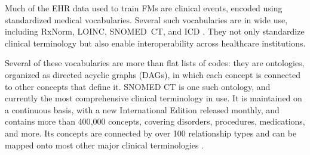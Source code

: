 Much of the EHR data used to train FMs are clinical events, encoded using standardized medical vocabularies. Several such vocabularies are in wide use, including RxNorm, LOINC, SNOMED~CT, and ICD . They not only standardize clinical terminology but also enable interoperability across healthcare institutions.

Several of these vocabularies are more than flat lists of codes: they are ontologies, organized as directed acyclic graphs (DAGs), in which each concept is connected to other concepts that define it. SNOMED CT is one such ontology, and currently the most comprehensive clinical terminology in use. It is maintained on a continuous basis, with a new International Edition released monthly, and contains more than 400{,}000 concepts, covering disorders, procedures, medications, and more. Its concepts are connected by over 100 relationship types and can be mapped onto most other major clinical terminologies .

